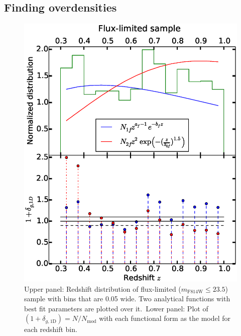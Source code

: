 \documentclass[twocolumn,useAMS,usenatbib]{mn2e}
\newcommand{\rachel}[1]{}
\begin{document}

\subsection{Finding overdensities}
\label{sub:overdensities}
\begin{figure}
 \centering
  \includegraphics[width=\columnwidth]{redshift_fluxlimited}
  \caption{Upper panel: Redshift distribution of flux-limited ($m_\text{F814W}\le 23.5$) sample with bins that are 0.05 wide. Two analytical functions with best fit parameters are plotted over it.\
           Lower panel: Plot of $(1+\delta_{g,\text{1D}}) = N/N_{\text{mod}}$ with each functional form as the model for each redshift bin.}
  \label{fig:redshift_fluxlimited}
\end{figure}
\end{document}
